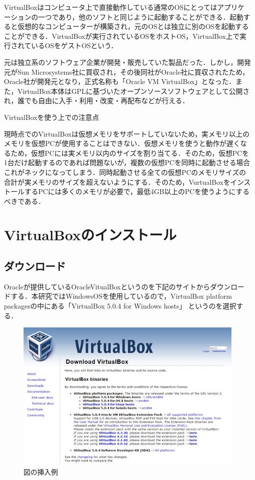 VirtualBoxはコンピュータ上で直接動作している通常のOSにとってはアプリケーションの一つであり，他のソフトと同じように起動することができる．起動すると仮想的なコンピューターが構築され，元のOSとは独立に別のOSを起動することができる．VirtualBoxが実行されているOSをホストOS，VirtualBox上で実行されているOSをゲストOSという．

元は独立系のソフトウェア企業が開発・販売していた製品だった．しかし，開発元がSun Microsystems社に買収され，その後同社がOracle社に買収されたため，Oracle社が開発元となり，正式名称も「Oracle VM VirtualBox」となった．また，VirtualBox本体はGPLに基づいたオープンソースソフトウェアとして公開され，誰でも自由に入手・利用・改変・再配布などが行える．

VirtualBoxを使う上での注意点

現時点でのVirtualBoxは仮想メモリをサポートしていないため，実メモリ以上のメモリを仮想PCが使用することはできない．仮想メモリを使うと動作が遅くなるため，仮想PCには実メモリ以内のサイズを割り当てる．そのため，仮想PCを1台だけ起動するのであれば問題ないが，複数の仮想PCを同時に起動させる場合これがネックになってしまう．同時起動させる全ての仮想PCのメモリサイズの合計が実メモリのサイズを超えないようにする．そのため，VurtualBoxをインストールするPCには多くのメモリが必要で，最低4GB以上のPCを使うようにするべきである．



\section{VirtualBoxのインストール}

\subsection{ダウンロード}

Oracleが提供しているOracleVitualBoxというのを下記のサイトからダウンロードする．本研究ではWindowsOSを使用しているので，VirtualBox platform packagesの中にある「VirtualBox 5.0.4 for Windows hosts」 というのを選択する．

\begin{figure}[H]
\centering
\includegraphics[width=13cm]{VitualBox.png}
\caption{図の挿入例}\label{サンプル図}
\end{figure}


